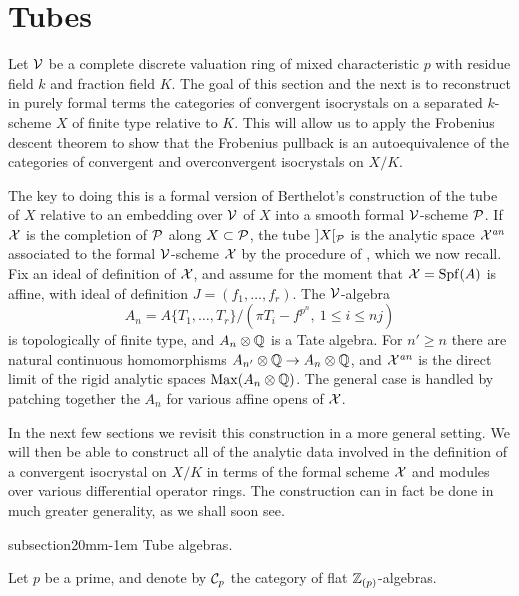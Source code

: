 \documentclass{article}
\makeatletter
\theoremstyle{change}
\renewcommand{\subsection}{\@startsection%
{subsection}{2}{0mm}{\baselineskip}{-1em}%
{\normalfont\normalsize\bfseries}}
\numberwithin{equation}{subsubsection}
\makeatother
\begin{document}
\section{Tubes}
\label{sec:tubes-and-isocrystals}

Let ${\cal V}$ be a complete discrete valuation ring of mixed characteristic
$p$ with residue field $k$ and fraction field $K$. The goal of this
section and the next is to reconstruct in purely formal terms the
categories of convergent isocrystals on a separated $k$-scheme $X$ of
finite type relative to $K$. This will allow us to apply the Frobenius
descent theorem to show that the Frobenius pullback is an
autoequivalence of the categories of convergent and overconvergent
isocrystals on $X/K$.

The key to doing this is a formal version of Berthelot's construction
of the tube of $X$ relative to an embedding over ${\cal V}$ of $X$ into a
smooth formal ${\cal V}$-scheme ${\cal P}$. If ${\cal X}$ is the completion of ${\cal P}$
along $X\subset{\cal P}$, the tube $]X[_{\cal P}$ is the analytic space
${\cal X}^{\mathit{an}}$ associated to the formal ${\cal V}$-scheme ${\cal X}$ by the procedure
of \cite[0.2.6]{berthelot:1996a}, which we now recall.  Fix an ideal
of definition of ${\cal X}$, and assume for the moment that ${\cal X}={\operatorname{Spf}({A})}$
is affine, with ideal of definition $J=(f_1,\ldots,f_r)$. The
${\cal V}$-algebra
\begin{displaymath}
  A_n=A\{T_1,\ldots,T_r\}/(\pi T_i-f^{p^n},\ 1\le i\le nj)
\end{displaymath}
is topologically of finite type, and $A_n\otimes{\mathbb Q}$ is a Tate
algebra. For $n'\ge n$ there are natural continuous homomorphisms
$A_{n'}\otimes{\mathbb Q}\to A_n\otimes{\mathbb Q}$, and ${\cal X}^{\mathit{an}}$ is the direct limit of
the rigid analytic spaces ${\operatorname{Max}}(A_n\otimes{\mathbb Q})$. The general case is
handled by patching together the $A_n$ for various affine opens of
${\cal X}$. 

In the next few sections we revisit this construction in a more
general setting. We will then be able to construct all of the analytic
data involved in the definition of a convergent isocrystal on $X/K$ in
terms of the formal scheme ${\cal X}$ and modules over various differential
operator rings. The construction can in fact be done in much greater
generality, as we shall soon see.

\subsection{Tube algebras.}
\label{sec:tubes}

Let $p$ be a prime, and denote by ${\cal C}_p$ the category of flat
${\mathbb Z}_{(p)}$-algebras. 
\end{document}
